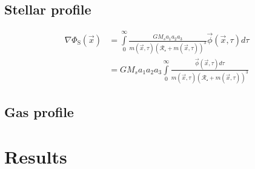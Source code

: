 	\subsection{Stellar profile}
	\begin{equation}
		\begin{array}{rl}
			\nabla \Phi_\text{S}(\vec{x}) & = \displaystyle\int\limits_{0}^{\infty} \frac{G M_{s} a_{1} a_{2} a_{3}}{m(\vec{x}, \tau)\left(\mathcal{R_s} + m(\vec{x}, \tau)\right)^{3}}
			\vec{\phi}(\vec{x}, \tau) d\tau \\
			& = G M_{s} a_{1} a_{2} a_{3} \displaystyle\int\limits_{0}^{\infty} \frac{ \vec{\phi}(\vec{x}, \tau) d\tau}{m(\vec{x}, \tau)\left(\mathcal{R_s} + m(\vec{x}, \tau)\right)^{3}}
		\end{array}
	\end{equation}
	\subsection{Gas profile}
	
	\section{Results}